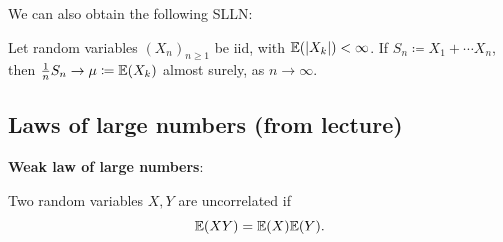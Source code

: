 \documentclass[10pt, a4paper]{article}
\begin{document}
We can also obtain the following SLLN:
\begin{theorem}[$L ^ 1$-SLLN]
    Let random variables $(X_n)_{n \geq 1}$ be iid,
    with $\mathbb{E}(|X_k|) < \infty$.
    If $S_n \coloneqq X_1 + \dotsi X_n$,
    then $\frac{1}{n}S_n \to \mu \coloneqq \mathbb{E}(X_k)$ almost surely,
    as $n \to \infty$.
\end{theorem}

\subsection{Laws of large numbers
(from lecture)}

\textbf{Weak law of large numbers}:

\begin{definition}
    Two random variables $X, Y$ are uncorrelated if
    \[
    \mathbb{E}(XY) = \mathbb{E}(X)\mathbb{E}(Y).
    \]
\end{definition}
\end{document}
